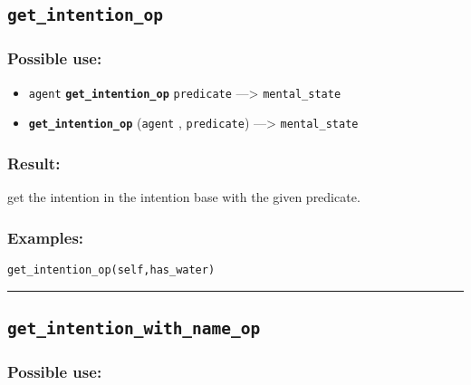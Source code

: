\documentclass[]{book}
\providecommand{\tightlist}{%
  \setlength{\itemsep}{0pt}\setlength{\parskip}{0pt}}
\theoremstyle{definition}
\theoremstyle{definition}
\theoremstyle{definition}
\theoremstyle{remark}
\begin{document}
\subsection{\texorpdfstring{\texttt{get\_intention\_op}}{get\_intention\_op}}\label{get_intention_op}

\subsubsection{Possible use:}\label{possible-use-214}

\begin{itemize}
\tightlist
\item
  \texttt{agent} \textbf{\texttt{get\_intention\_op}} \texttt{predicate}
  ---\textgreater{} \texttt{mental\_state}
\item
  \textbf{\texttt{get\_intention\_op}} (\texttt{agent} ,
  \texttt{predicate}) ---\textgreater{} \texttt{mental\_state}
\end{itemize}

\subsubsection{Result:}\label{result-208}

get the intention in the intention base with the given predicate.

\subsubsection{Examples:}\label{examples-161}

\begin{verbatim}
get_intention_op(self,has_water) 
\end{verbatim}

\begin{center}\rule{0.5\linewidth}{\linethickness}\end{center}

\subsection{\texorpdfstring{\texttt{get\_intention\_with\_name\_op}}{get\_intention\_with\_name\_op}}\label{get_intention_with_name_op}

\subsubsection{Possible use:}\label{possible-use-215}
\end{document}
